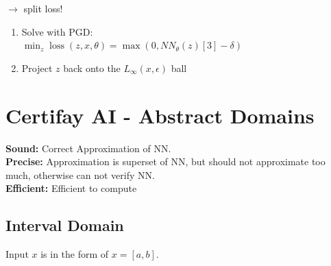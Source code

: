 \documentclass[11pt]{extarticle}
\begin{document}
\begin{multicols*}{3}
\begin{enumerate}[leftmargin=*]
            $\rightarrow$ split loss!
            \begin{enumerate}[label*=\arabic*.]
                \item Solve with PGD: \\
                $\min _ { z } \operatorname { loss } ( z , x , \theta ) = \max \left( 0 , N N _ { \theta } ( z ) [ 3 ] - \delta \right)$
                \item Project $z$ back onto the $L _ { \infty } ( x , \epsilon )$ ball
            \end{enumerate}
            
            
            
            \end{enumerate}
            
		\section{Certifay AI - Abstract Domains}
		    \textbf{Sound:} Correct Approximation of NN.\\
		    \textbf{Precise:} Approximation is superset of NN, but should not approximate too much, otherwise can not verify NN.\\
		    \textbf{Efficient:} Efficient to compute
			\subsection*{Interval Domain}
			Input $x$ is in the form of $x = [a,b]$. \\
			

\end{multicols*}
\end{document}
